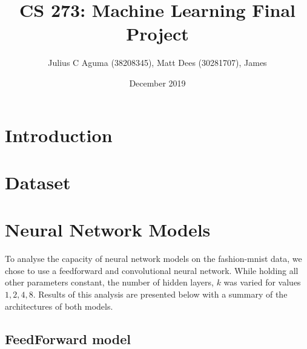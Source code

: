 \documentclass{article}
\title{CS 273: Machine Learning Final Project}
\author{Julius C Aguma (38208345), Matt Dees (30281707), James}
\date{December 2019}
\begin{document}
\maketitle

\section{Introduction}
\section{Dataset}
\section{Neural Network Models}

\par To analyse the capacity of neural network models on the fashion-mnist data, we chose to use a feedforward and convolutional neural network. While holding all other parameters constant, the number of hidden layers, $k$ was varied for values ${1,2,4,8}$. Results of this analysis are presented below with a summary of the architectures of both models.

\subsection{FeedForward model}
\end{document}

